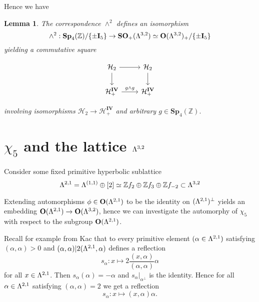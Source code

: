 \documentclass[9pt]{amsart} \usepackage[utf8]{inputenc}
\newtheorem{lemma}{Lemma}
\newcommand{\Z}{\mathbb{Z}} \newcommand{\C}{\mathbb{C}}
\newcommand{\HypPlan}{\Lambda^{(1,1)}}
\newcommand{\Sp}{\mathbf{Sp}}
\newcommand{\Orth}{\mathbf{O}}
\newcommand{\SO}{\mathbf{SO}}
\newcommand{\Hpl}{\mathcal{H}}
\newcommand{\IV}{\mathbf{IV}}
\newcommand{\Id}{\mathbf{I}}
\begin{document}
Hence we have

\begin{lemma}
The correspondence $\wedge^2$ defines an isomorphism $$\wedge^2 :
\Sp_4(\Z)/\{\pm \Id_5\} \rightarrow \SO_+(\La^{3,2}) \simeq
\Orth(\La^{3,2})_+/\{\pm\Id_5\}$$ yielding a commutative square

  \[ \begin{tikzcd}
\Hpl_2 \arrow{r}{} \arrow[swap]{d}{} & \Hpl_2 \arrow{d}{} \\%
\Hpl_+^{\IV} \arrow{r}{g \wedge g}& \Hpl_+^{\IV}
\end{tikzcd}
\]


involving isomorphisms $\Hpl_2 \rightarrow \Hpl_+^{\IV}$ and arbitrary
$g \in \Sp_4(\Z).$

\end{lemma}

\section{$\chi_5$ and the lattice $\Lambda^{3,2}$}

Consider some fixed primitive hyperbolic sublattice
$$\La^{2,1} = \HypPlan \oplus [2] \simeq \Z f_2 \oplus \Z f_3 \oplus \Z
f_{-2} \subset \La^{3,2}$$

Extending automorphisms $\phi \in \Orth(\La^{2,1})$ to be the identity
on $(\Lambda^{2,1})^{\perp}$ yields an embedding $\Orth(\La^{2,1})
\rightarrow \Orth(\La^{3,2})$, hence we can investigate the automorphy
of $\chi_5$ with respect to the subgroup $\Orth(\La^{2,1})$.


Recall for example from Kac \cite{KAC:1} that to every primitive element $(\alpha \in
\Lambda^{2,1})$ satisfying $(\alpha,\alpha) > 0$ and $(\alpha, \alpha) |
2(\Lambda^{2,1}, \alpha)$ defines a reflection $$s_{\alpha}: x \mapsto
2\frac{(x,\alpha)}{(\alpha, \alpha)}\alpha$$ for all $x \in \Lambda^{2,1}$. Then
$s_{\alpha}(\alpha) = -\alpha$ and $s_{\alpha}|_{\alpha^{\perp}}$ is the
identity. Hence for all $\alpha \in \Lambda^{2,1}$ satisfying
$(\alpha,\alpha) = 2$ we get a reflection $$s_{\alpha}: x \mapsto
(x,\alpha)\alpha.$$
\end{document}
